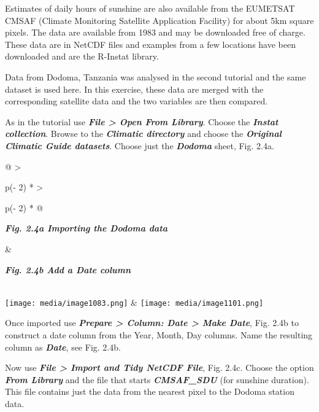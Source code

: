 \documentclass[
  letterpaper,
  DIV=11,
  numbers=noendperiod]{scrreprt}
\begin{document}
Estimates of daily hours of sunshine are also available from the
EUMETSAT CMSAF (Climate Monitoring Satellite Application Facility) for
about 5km square pixels. The data are available from 1983 and may be
downloaded free of charge. These data are in NetCDF files and examples
from a few locations have been downloaded and are the R-Instat library.

Data from Dodoma, Tanzania was analysed in the second tutorial and the
same dataset is used here. In this exercise, these data are merged with
the corresponding satellite data and the two variables are then
compared.

As in the tutorial use \textbf{\emph{File \textgreater{} Open From
Library}}. Choose the \textbf{\emph{Instat collection}}. Browse to the
\textbf{\emph{Climatic directory}} and choose the \textbf{\emph{Original
Climatic Guide datasets}}. Choose just the \textbf{\emph{Dodoma}} sheet,
Fig. 2.4a.

\begin{longtable}[]{@{}
  >{\raggedright\arraybackslash}p{(\columnwidth - 2\tabcolsep) * }
  >{\raggedright\arraybackslash}p{(\columnwidth - 2\tabcolsep) * }@{}}
\toprule\noalign{}
\begin{minipage}[b]{\linewidth}\raggedright
\textbf{\emph{Fig. 2.4a Importing the Dodoma data}}
\end{minipage} & \begin{minipage}[b]{\linewidth}\raggedright
\textbf{\emph{Fig. 2.4b Add a Date column}}
\end{minipage} \\
\midrule\noalign{}
\endhead
\bottomrule\noalign{}
\endlastfoot
\texttt{[image: media/image1083.png]} &
\texttt{[image: media/image1101.png]} \\
\end{longtable}

Once imported use \textbf{\emph{Prepare \textgreater{} Column: Date
\textgreater{} Make Date}}, Fig. 2.4b to construct a date column from
the Year, Month, Day columns. Name the resulting column as
\textbf{\emph{Date}}, see Fig. 2.4b.

Now use \textbf{\emph{File \textgreater{} Import and Tidy NetCDF File}},
Fig. 2.4c. Choose the option \textbf{\emph{From Library}} and the file
that starts \textbf{\emph{CMSAF\_SDU}} (for sunshine duration). This
file contains just the data from the nearest pixel to the Dodoma station
data.
\end{document}
